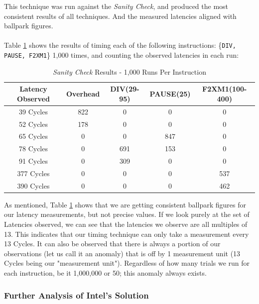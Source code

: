 \documentclass[bsc,frontabs,twoside,singlespacing,parskip,deptreport]{infthesis}     %
\begin{document}
This technique was run against the \textit{Sanity Check}, and produced the most consistent results of all techniques. And the measured latencies aligned with ballpark figures.\\
\\
Table \ref{fig:sanity-results} shows the results of timing each of the following instructions: \{\texttt{DIV, PAUSE, F2XM1}\} 1,000 times, and counting the observed latencies in each run:
\begin{table}[!h]
\begin{center}
\caption{\textit{Sanity Check} Results - 1,000 Runs Per Instruction}
\label{fig:sanity-results}
\begin{tabular}{ |c||c|c|c|c| } 
    \hline
    Latency Observed & Overhead & DIV(29-95) & PAUSE(25) & F2XM1(100-400) \\
    \hline
    39 Cycles  & 822 & 0   & 0   & 0   \\
    52 Cycles  & 178 & 0   & 0   & 0   \\
    65 Cycles  & 0   & 0   & 847 & 0   \\
    78 Cycles  & 0   & 691 & 153 & 0   \\
    91 Cycles  & 0   & 309 & 0   & 0   \\
    377 Cycles & 0   & 0   & 0   & 537 \\
    390 Cycles & 0   & 0   & 0   & 462 \\
    \hline
\end{tabular}
\end{center}
\end{table}

\newpage

As mentioned, Table \ref{fig:sanity-results} shows that we are getting consistent ballpark figures for our latency measurements, but not precise values. If we look purely at the set of Latencies observed, we can see that the latencies we observe are all multiples of 13. This indicates that our timing technique can only take a measurement every 13 Cycles. It can also be observed that there is always a portion of our observations (let us call it an anomaly) that is off by 1 measurement unit (13 Cycles being our "measurement unit"). Regardless of how many trials we run for each instruction, be it 1,000,000 or 50; this anomaly always exists.


\subsubsection{Further Analysis of Intel's Solution}
\end{document}
